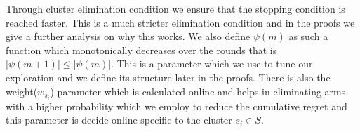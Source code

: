 	Through cluster elimination condition we ensure that the stopping condition is reached faster. This is a much stricter elimination condition and in the proofs we give a further analysis on why this works. We also define $\psi(m)$ as such a function which monotonically decreases over the rounds that is $|\psi(m+1)| \leq |\psi(m)|$. This is a parameter which we use to tune our exploration and we define its structure later in the proofs. There is also the weight($w_{s_{i}}$) parameter which   is calculated online and helps in eliminating arms with a higher probability which we employ to reduce the cumulative regret and this parameter is decide online specific to the cluster $s_{i}\in S$.
